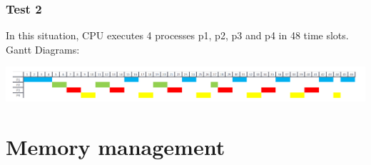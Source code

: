 \documentclass[13pt,a4paper]{article}
\begin{document}
			\subsubsection{Test 2}
				In this situation, CPU executes 4 processes p1, p2, p3 and p4 in 48 time slots.\\
				Gantt Diagrams:
				\begin{center}
					\includegraphics[width=15cm]{gantt_1.png}
				\end{center}
	\section{Memory management}
\end{document}
